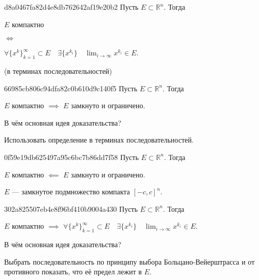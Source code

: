 \begin{note}{d8a0467fa82d4e8db762642af19e20b2}
    Пусть \({ E \subset \mathbb R^{n} }\).
    Тогда
    \begin{center}
        \begin{icloze}{2}\({ E }\) компактно \end{icloze}
        \begin{icloze}{3}\({ \iff }\)\end{icloze}
        \begin{icloze}{1}\({ \displaystyle \forall \{ x^{k} \}_{k = 1}^{\infty} \subset E \quad \exists \{ x^{k_i} \} \quad \lim_{i \to \infty} x^{k_i} \in E }\).\end{icloze}
    \end{center}

    \begin{center}
        \tiny (в терминах последовательностей)
    \end{center}
\end{note}

\begin{note}{66985cb806c94dfa82c0b610d9c140f5}
    Пусть \({ E \subset \mathbb R^{n} }\).
    Тогда
    \begin{center}
        \({ E }\) компактно \({ \implies }\) \({ E }\) замкнуто и ограничено.
    \end{center}
    В чём основная идея доказательства?

    \begin{cloze}{1}
        Использовать определение в терминах последовательностей.
    \end{cloze}
\end{note}

\begin{note}{0f59e19db625497a95c6bc7b86dd7f58}
    Пусть \({ E \subset \mathbb R^{n} }\).
    Тогда
    \begin{center}
        \({ E }\) компактно \({ \impliedby }\) \({ E }\) замкнуто и ограничено.
    \end{center}

    \begin{cloze}{1}
        \({ E }\) --- замкнутое подмножество компакта \({ [-c, c]^{n} }\).
    \end{cloze}
\end{note}

\begin{note}{302a825507eb4e8f96bf410b9004a430}
    Пусть \({ E \subset \mathbb R^{n} }\).
    Тогда
    \begin{center}
        \({ E }\) компактно \({ \implies }\) \({ \displaystyle \forall \{ x^{k} \}_{k = 1}^{\infty} \subset E \quad \exists \{ x^{k_i} \} \quad \lim_{i \to \infty} x^{k_i} \in E }\).
    \end{center}
    В чём основная идея доказательства?

    \begin{cloze}{1}
        Выбрать последовательность по принципу выбора Больцано-Вейерштрасса и от противного показать, что её предел лежит в \({ E }\).
    \end{cloze}
\end{note}

